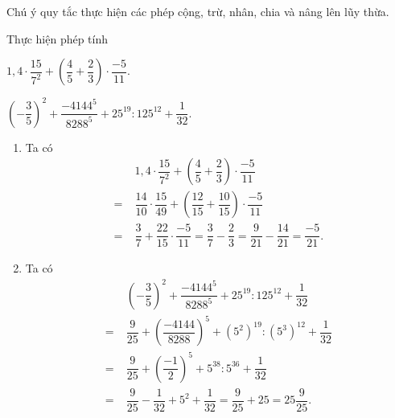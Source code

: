 \begin{dang}
Chú ý quy tắc thực hiện các phép cộng, trừ, nhân, chia và nâng lên lũy thừa.
\end{dang}
\begin{vd}
Thực hiện phép tính
\begin{listEX}[2]
	\item $1,4\cdot\dfrac{15}{7^2}+\left(\dfrac{4}{5}+\dfrac{2}{3}\right)\cdot\dfrac{-5}{11}$.
	\item $\left(-\dfrac{3}{5}\right)^2+\dfrac{-4144^5}{8288^5}+25^{19}:125^{12}+\dfrac{1}{32}$.
\end{listEX}
\loigiai
{
\begin{enumerate}
\item Ta có \begin{align*}
&1,\!4\cdot\dfrac{15}{7^2}+\left(\dfrac{4}{5}+\dfrac{2}{3}\right)\cdot\dfrac{-5}{11}\\ 
=\;&\dfrac{14}{10}\cdot\dfrac{15}{49}+\left(\dfrac{12}{15}+\dfrac{10}{15}\right)\cdot\dfrac{-5}{11}\\
=\;&\dfrac{3}{7}+\dfrac{22}{15}\cdot\dfrac{-5}{11}=\dfrac{3}{7}-\dfrac{2}{3}=\dfrac{9}{21}-\dfrac{14}{21}=\dfrac{-5}{21}.
\end{align*}
\item Ta có\begin{align*}
&\left(-\dfrac{3}{5}\right)^2+\dfrac{-4144^5}{8288^5}+25^{19}:125^{12}+\dfrac{1}{32}\\ 
=\;&\dfrac{9}{25}+\left(\dfrac{-4144}{8288}\right)^5+\left(5^2\right)^{19}:\left(5^3\right)^{12}+\dfrac{1}{32}\\
=\;&\dfrac{9}{25}+\left(\dfrac{-1}{2}\right)^5+5^{38}:5^{36}+\dfrac{1}{32}\\
=\;&\dfrac{9}{25}-\dfrac{1}{32}+5^2+\dfrac{1}{32}=\dfrac{9}{25}+25=25\dfrac{9}{25}.
\end{align*}
\end{enumerate}
}
\end{vd}
